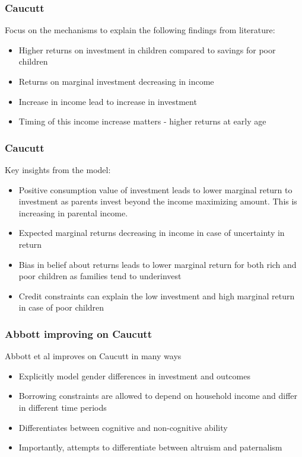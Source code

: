 \documentclass{beamer}
\begin{document}
\begin{frame}
\frametitle{Caucutt}
Focus on the mechanisms to explain the following findings from literature:

\begin{itemize}
\item Higher returns on investment in children compared to savings for poor children
\item Returns on marginal investment decreasing in income
\item Increase in income lead to increase in investment
\item Timing of this income increase matters - higher returns at early age
\end{itemize}
\end{frame}

\begin{frame}
\frametitle{Caucutt}
Key insights from the model:
\begin{itemize}
\item Positive consumption value of investment leads to lower marginal return to investment as parents invest beyond the income maximizing amount. This is increasing in parental income.
\item Expected marginal returns decreasing in income in case of uncertainty in return
\item Bias in belief about returns leads to lower marginal return for both rich and poor children as families tend to underinvest 
\item Credit constraints can explain the low investment and high marginal return in case of poor children
\end{itemize}
\end{frame}

\begin{frame}
\frametitle{Abbott improving on Caucutt}
Abbott et al improves on Caucutt in many ways
\begin{itemize}
\item Explicitly model gender differences in investment and outcomes
\item Borrowing constraints are allowed to depend on household income and differ in different time periods  
\item Differentiates between cognitive and non-cognitive ability
\item Importantly, attempts to differentiate between altruism and paternalism

\end{itemize}
\end{frame}
\end{document}
